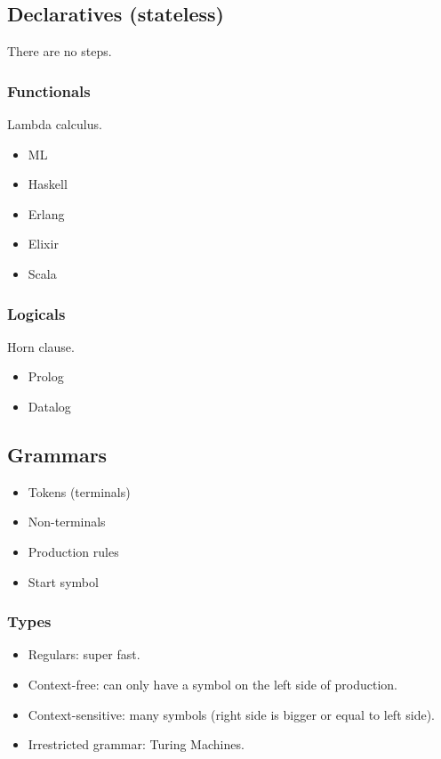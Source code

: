 \documentclass[11pt]{article}
\begin{document}
\subsection{Declaratives (stateless)}
\label{sec:org52eddab}
There are no steps.
\subsubsection{Functionals}
\label{sec:org377ab43}
Lambda calculus.
\begin{itemize}
\item ML
\item Haskell
\item Erlang
\item Elixir
\item Scala
\end{itemize}
\subsubsection{Logicals}
\label{sec:org4287419}
Horn clause.
\begin{itemize}
\item Prolog
\item Datalog
\end{itemize}
\subsection{Grammars}
\label{sec:orgfd9d52f}
\begin{itemize}
\item Tokens (terminals)
\item Non-terminals
\item Production rules
\item Start symbol
\end{itemize}
\subsubsection{Types}
\label{sec:org3fc26a4}
\begin{itemize}
\item Regulars: super fast.
\item Context-free: can only have a symbol on the left side of production.
\item Context-sensitive: many symbols (right side is bigger or equal to left side).
\item Irrestricted grammar: Turing Machines.
\end{itemize}
\end{document}

